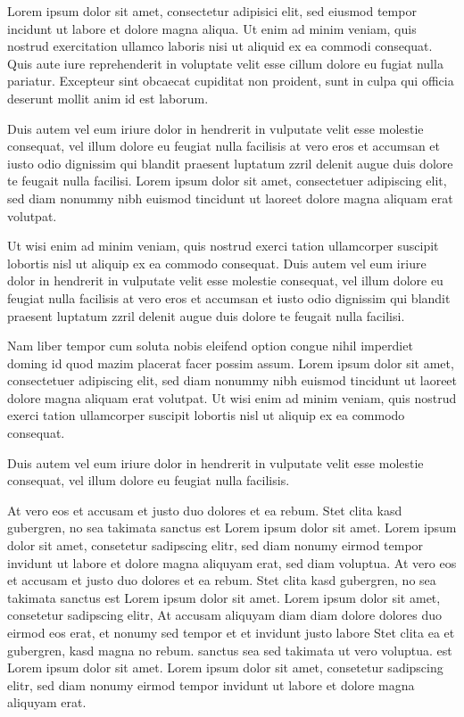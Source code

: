 \documentclass[twoside,a4paper]{article}
\begin{document}
Lorem ipsum dolor sit amet, consectetur adipisici elit, sed eiusmod
tempor incidunt ut labore et dolore magna aliqua. Ut enim ad minim
veniam, quis nostrud exercitation ullamco laboris nisi ut aliquid ex
ea commodi consequat. Quis aute iure reprehenderit in voluptate velit
esse cillum dolore eu fugiat nulla pariatur. Excepteur sint obcaecat
cupiditat non proident, sunt in culpa qui officia deserunt mollit anim
id est laborum.


Duis autem vel eum iriure dolor in hendrerit in vulputate velit esse
molestie consequat, vel illum dolore eu feugiat nulla facilisis at
vero eros et accumsan et iusto odio dignissim qui blandit praesent
luptatum zzril delenit augue duis dolore te feugait nulla
facilisi. Lorem ipsum dolor sit amet, consectetuer adipiscing elit,
sed diam nonummy nibh euismod tincidunt ut laoreet dolore magna
aliquam erat volutpat.

Ut wisi enim ad minim veniam, quis nostrud exerci tation ullamcorper
suscipit lobortis nisl ut aliquip ex ea commodo consequat. Duis autem
vel eum iriure dolor in hendrerit in vulputate velit esse molestie
consequat, vel illum dolore eu feugiat nulla facilisis at vero eros et
accumsan et iusto odio dignissim qui blandit praesent luptatum zzril
delenit augue duis dolore te feugait nulla facilisi.

Nam liber tempor cum soluta nobis eleifend option congue nihil
imperdiet doming id quod mazim placerat facer possim assum. Lorem
ipsum dolor sit amet, consectetuer adipiscing elit, sed diam nonummy
nibh euismod tincidunt ut laoreet dolore magna aliquam erat
volutpat. Ut wisi enim ad minim veniam, quis nostrud exerci tation
ullamcorper suscipit lobortis nisl ut aliquip ex ea commodo consequat.

Duis autem vel eum iriure dolor in hendrerit in vulputate velit esse
molestie consequat, vel illum dolore eu feugiat nulla facilisis.

At vero eos et accusam et justo duo dolores et ea rebum. Stet clita
kasd gubergren, no sea takimata sanctus est Lorem ipsum dolor sit
amet. Lorem ipsum dolor sit amet, consetetur sadipscing elitr, sed
diam nonumy eirmod tempor invidunt ut labore et dolore magna aliquyam
erat, sed diam voluptua. At vero eos et accusam et justo duo dolores
et ea rebum. Stet clita kasd gubergren, no sea takimata sanctus est
Lorem ipsum dolor sit amet. Lorem ipsum dolor sit amet, consetetur
sadipscing elitr, At accusam aliquyam diam diam dolore dolores duo
eirmod eos erat, et nonumy sed tempor et et invidunt justo labore Stet
clita ea et gubergren, kasd magna no rebum. sanctus sea sed takimata
ut vero voluptua. est Lorem ipsum dolor sit amet. Lorem ipsum dolor
sit amet, consetetur sadipscing elitr, sed diam nonumy eirmod tempor
invidunt ut labore et dolore magna aliquyam erat.
\end{document}
